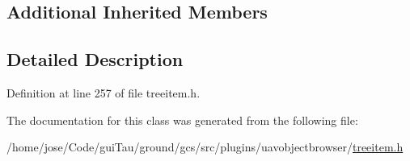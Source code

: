 \subsection*{Additional Inherited Members}


\subsection{Detailed Description}


Definition at line 257 of file treeitem.\-h.



The documentation for this class was generated from the following file\-:\begin{DoxyCompactItemize}
\item 
/home/jose/\-Code/gui\-Tau/ground/gcs/src/plugins/uavobjectbrowser/\hyperlink{treeitem_8h}{treeitem.\-h}\end{DoxyCompactItemize}
